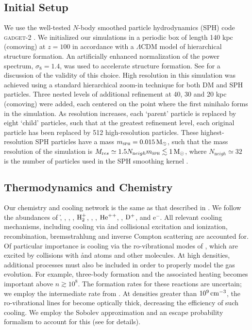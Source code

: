 \documentclass[../thesis.tex]{subfiles}
\begin{document}
\subsection{Initial Setup}
\label{xr_setup}
We use the well-tested $N$-body smoothed particle hydrodynamics (SPH) code \textsc{gadget-2} \citep{Springel2005}. We initialized our simulations in a periodic box of length 140 kpc (comoving) at $z=100$ in accordance with a $\Lambda$CDM model of hierarchical structure formation. An artificially enhanced normalization of the power spectrum, $\sigma_8 = 1.4$, was used to accelerate structure formation. See \citet{StacyGreifBromm2010} for a discussion of the validity of this choice. High resolution in this simulation was achieved using a standard hierarchical zoom-in technique for both DM and SPH particles. Three nested levels of additional refinement at 40, 30 and 20 kpc (comoving) were added, each centered on the point where the first minihalo forms in the simulation.  As resolution increases, each `parent' particle is replaced by eight `child' particles, such that at the greatest refinement level, each original particle has been replaced by 512 high-resolution particles.  These highest-resolution SPH particles have a mass $m_{\textsc{sph}} = 0.015\,\mathrm{M}_{\odot}$, such that the mass resolution of the simulation is $M_{\mathrm res} \simeq 1.5 N_{\mathrm neigh} m_{\textsc{sph}} \lesssim 1\,\mathrm{M}_{\odot}$, where $N_{\mathrm neigh} \simeq 32$ is the number of particles used in the SPH smoothing kernel \citep{BateBurkert1997}.

\subsection{Thermodynamics and Chemistry}
\label{xr_chemistry}
Our chemistry and cooling network is the same as that described in \citet{Greifetal2009b}.  We follow the abundances of \h, \hplus, \hminus, \htwo, $\mathrm{H}_2^+$, \he, \heplus, $\mathrm{He}^{++}$, \deut, $\mathrm{D}^+$, \hd and e$^-$.  All relevant cooling mechanisms, including cooling via \h and \he collisional excitation and ionization, recombination, bremsstrahlung and inverse Compton scattering are accounted for.  Of particular importance is cooling via the ro-vibrational modes of \htwo, which are excited by collisions with \h and \he atoms and other \htwo molecules.  At high densities, additional \htwo processes must also be included in order to properly model the gas evolution.  For example, three-body \htwo formation and the associated heating becomes important above $n\gtrsim10^8$\cc \citep{Turketal2011a}.  The formation rates for these reactions are uncertain; we employ the intermediate rate from \citet{PallaSalpeterStahler1983}. At densities greater than \about$10^9\,\mathrm{cm}^{-3}$, the ro-vibrational lines for \htwo become optically thick, decreasing the efficiency of such cooling. We employ the Sobolev approximation and an escape probability formalism to account for this (see \citealt{Yoshidaetal2006, Greifetal2011} for details).
\end{document}
